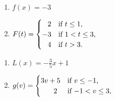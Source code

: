 \begin{enumerate}
\begin{enumerate}
\begin{multicols}{2}
 \end{multicols}

\end{enumerate}


\setcounter{HW}{\value{enumi}}
\end{enumerate}


\begin{multicols}{2}

\begin{enumerate}

\setcounter{enumi}{\value{HW}}

\item $f(x) = -3$  

\item $F(t) = \begin{cases} 
  \hphantom{\text{$-$}}2 &  \text{if $t \leq 1$, } \\
  -3  & \text{if $1 < t \leq 3$,} \\
  \hphantom{\text{$-$}}4 & \text{if $t>3$.} \\
 \end{cases}$

\setcounter{HW}{\value{enumi}}

\end{enumerate}

\end{multicols}

\begin{multicols}{2}

\begin{enumerate}

\setcounter{enumi}{\value{HW}}

\item $L(x) = -\frac{3}{5} x + 1$ 

\item $g(v) = \begin{cases} 
   3v+5 &  \text{if $v \leq -1$, } \\
  \hphantom{\text{$3v+$}}2  & \text{if $-1 <  v \leq 3$,} \\
    \end{cases}$

\setcounter{HW}{\value{enumi}}

\end{enumerate}

\end{multicols}



